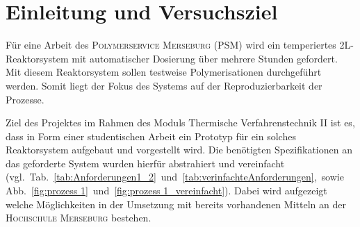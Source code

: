 \section{Einleitung und Versuchsziel}
\label{sec:aufgabenstellung}

Für eine Arbeit des \textsc{Polymerservice Merseburg (PSM)} wird ein temperiertes 2L-Reaktorsystem mit automatischer Dosierung über mehrere Stunden gefordert.
Mit diesem Reaktorsystem sollen testweise Polymerisationen durchgeführt werden. Somit liegt der Fokus des Systems auf der Reproduzierbarkeit der Prozesse.

Ziel des Projektes im Rahmen des Moduls Thermische Verfahrenstechnik II ist es, dass in Form einer studentischen Arbeit ein Prototyp für ein solches Reaktorsystem aufgebaut und vorgestellt wird. Die benötigten Spezifikationen an das geforderte System wurden hierfür abstrahiert und vereinfacht \mbox{(vgl. Tab. \ref{tab:Anforderungen1_2} und \ref{tab:verinfachteAnforderungen}, sowie Abb. \ref{fig:prozess 1} und \ref{fig:prozess 1_vereinfacht})}. Dabei wird aufgezeigt welche Möglichkeiten in der Umsetzung mit bereits vorhandenen Mitteln an der \textsc{Hochschule Merseburg} bestehen.

